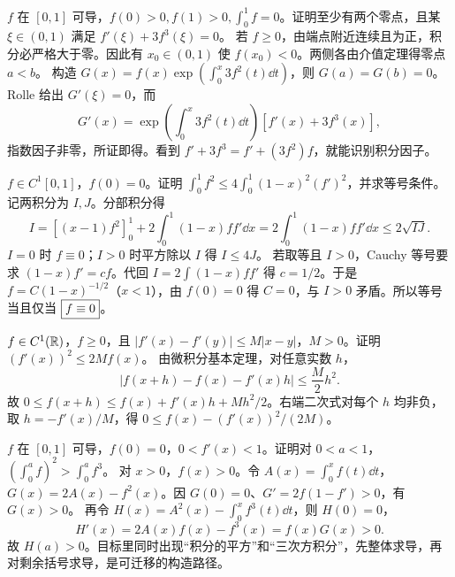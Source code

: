 $f$ 在 $[0,1]$ 可导，$f(0)>0,f(1)>0,\int_0^1 f=0$。证明至少有两个零点，且某 $\xi\in(0,1)$ 满足 $f'(\xi)+3f^3(\xi)=0$。
\sol 若 $f\ge0$，由端点附近连续且为正，积分必严格大于零。因此有 $x_0\in(0,1)$ 使 $f(x_0)<0$。两侧各由介值定理得零点 $a<b$。
构造 $G(x)=f(x)\exp(\int_0^x3f^2(t)\dd t)$，则 $G(a)=G(b)=0$。Rolle 给出 $G'(\xi)=0$，而
\[G'(x)=\exp\left(\int_0^x3f^2(t)\dd t\right)[f'(x)+3f^3(x)],\]
指数因子非零，所证即得。看到 $f'+3f^3=f'+(3f^2)f$，就能识别积分因子。

$f\in C^1[0,1]$，$f(0)=0$。证明 $\int_0^1 f^2\le4\int_0^1(1-x)^2(f')^2$，并求等号条件。
\sol 记两积分为 $I,J$。分部积分得
\[I=[(x-1)f^2]_0^1+2\int_0^1(1-x)ff'\dd x
=2\int_0^1(1-x)ff'\dd x\le2\sqrt{IJ}.\]
$I=0$ 时 $f\equiv0$；$I>0$ 时平方除以 $I$ 得 $I\le4J$。
若取等且 $I>0$，Cauchy 等号要求 $(1-x)f'=cf$。代回 $I=2\int(1-x)ff'$ 得 $c=1/2$。于是 $f=C(1-x)^{-1/2}$（$x<1$），由 $f(0)=0$ 得 $C=0$，与 $I>0$ 矛盾。所以等号当且仅当 $\boxed{f\equiv0}$。

$f\in C^1(\mathbb R)$，$f\ge0$，且 $|f'(x)-f'(y)|\le M|x-y|$，$M>0$。证明 $(f'(x))^2\le2Mf(x)$。
\sol 由微积分基本定理，对任意实数 $h$，
\[|f(x+h)-f(x)-f'(x)h|\le\frac M2h^2.\]
故 $0\le f(x+h)\le f(x)+f'(x)h+Mh^2/2$。右端二次式对每个 $h$ 均非负，取 $h=-f'(x)/M$，得 $0\le f(x)-(f'(x))^2/(2M)$。

$f$ 在 $[0,1]$ 可导，$f(0)=0$，$0<f'(x)<1$。证明对 $0<a<1$，$(\int_0^a f)^2>\int_0^a f^3$。
\sol 对 $x>0$，$f(x)>0$。令 $A(x)=\int_0^x f(t)\dd t$，
$G(x)=2A(x)-f^2(x)$。因 $G(0)=0$、$G'=2f(1-f')>0$，有 $G(x)>0$。
再令 $H(x)=A^2(x)-\int_0^x f^3(t)\dd t$，则 $H(0)=0$，
\[H'(x)=2A(x)f(x)-f^3(x)=f(x)G(x)>0.\]
故 $H(a)>0$。目标里同时出现“积分的平方”和“三次方积分”，先整体求导，再对剩余括号求导，是可迁移的构造路径。
